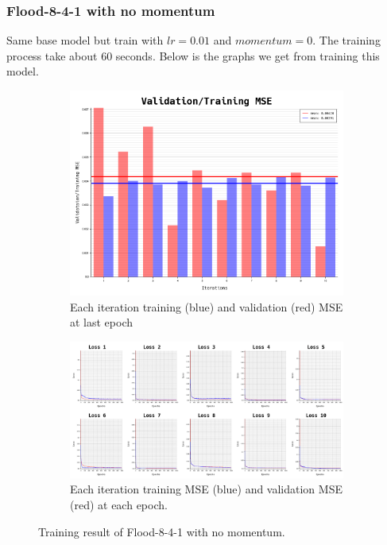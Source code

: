 \documentclass{article}
\begin{document}
\newpage
\subsubsection*{Flood-8-4-1 with no momentum}
Same base model but train with $lr = 0.01$ and $momentum = 0$.
The training process take about $60$ seconds.
Below is the graphs we get from training this model. 
\begin{figure}[ht]
	\begin{subfigure}{\textwidth}
		\centering
		\includegraphics[scale=0.3]{flood-8-4-1_2/cv_l}
		\caption{Each iteration training (blue) and validation (red) MSE at last epoch}
		\label{fig:3a}
	\end{subfigure}
	\begin{subfigure}{\textwidth}
		\includegraphics[width=\textwidth]{flood-8-4-1_2/loss}
		\caption{Each iteration training MSE (blue) and validation MSE (red) at each epoch.}
		\label{fig:3b}
	\end{subfigure}
	\caption{Training result of Flood-8-4-1 with no momentum.}
	\label{fig:3}
\end{figure}
\FloatBarrier
\end{document}
